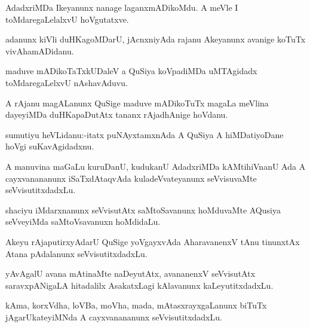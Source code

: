 \documentclass{article}
\begin{document}
\begin{mn}%
AdadxriMDa Ikeyanunx nanage laganxmADikoMdu. A meVle I toMdaregaLelalxvU hoVgutatxve.
\end{mn}

\begin{mn}%
adanunx kiVli duHKagoMDarU, jAcnxniyAda rajanu Akeyanunx avanige koTuTx vivAhamADidanu.
\end{mn}

\begin{mn}%
maduve mADikoTaTxkUDaleV a QuSiya koVpadiMDa uMTAgidadx toMdaregaLelxvU nAshavAduvu.
\end{mn}

\begin{mn}%
A rAjanu magALanunx QuSige maduve mADikoTuTx magaLa meVlina dayeyiMDa duHKapaDutAtx tananx 
rAjadhAnige hoVdanu.
\end{mn}


\begin{mn}%
sumutiyu heVLidanu:-itatx puNAyxtamxnAda A QuSiya A hiMDatiyoDane hoVgi suKavAgidadxnu.
\end{mn}

\begin{mn}%
A manuvina maGaLu kuruDanU, kudukanU AdadxriMDa kAMtihiVnanU Ada A cayxvanananunx 
iSaTxdAtaqvAda kuladeVvateyanunx seVvisuvaMte seVvisutitxdadxLu.
\end{mn}

\begin{mn}%
shaciyu iMdarxnanunx seVvisutAtx saMtoSavanunx hoMduvaMte AQusiya seVveyiMda 
saMtoVsavanuxn hoMdidaLu.
\end{mn}

\begin{mn}%
Akeyu rAjaputirxyAdarU QuSige yoVgayxvAda AharavanenxV tAnu tinunxtAx Atana pAdalanunx 
seVvisutitxdadxLu.
\end{mn}

\begin{mn}%
yAvAgalU avana mAtinaMte naDeyutAtx, avananenxV seVvisutAtx saravxpANigaLA hitadalilx 
AsakatxLagi kAlavanunx kaLeyutitxdadxLu.
\end{mn}

\begin{mn}%
kAma, korxVdha, loVBa, moVha, mada, mAtasxrayxgaLanunx biTuTx jAgarUkateyiMNda A 
cayxvanananunx seVvisutitxdadxLu.
\end{mn}
\end{document}
